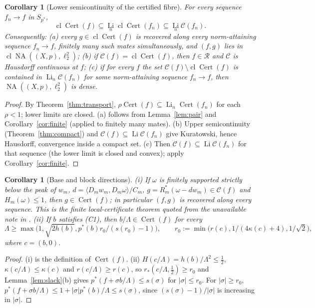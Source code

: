 \documentclass[10pt]{amsart}
\newtheorem{corollary}[theorem]{Corollary}
\theoremstyle{definition}
\theoremstyle{remark}
\newcommand{\NA}{\operatorname{NA}}
\newcommand{\Cset}{\mathcal C}
\newcommand{\Cert}{\operatorname{Cert}}
\newcommand{\Li}{\operatorname*{Li}}
\newcommand{\cl}{\operatorname{cl}}
\newcommand{\Rec}{\mathcal R}
\newcommand{\ip}[2]{\langle #1,#2\rangle}
\begin{document}
\begin{corollary}[Lower semicontinuity of the certified fibre]\label{cor:lsc}
For every sequence $f_n\to f$ in $S_{p^*}$,
\[
 \cl\Cert(f)\subseteq\Li_n\cl\Cert(f_n)\subseteq\Li_n\Cset(f_n).
\]
Consequently: \textup{(a)} every $g\in\cl\Cert(f)$ is recovered along every
norm-attaining sequence $f_n\to f$, finitely many such mates simultaneously,
and $(f,g)$ lies in $\cl\NA((X,p),\ell_2^2)$; \textup{(b)} if
$\Cset(f)=\cl\Cert(f)$, then $f\in\Rec$ and $\Cset$ is Hausdorff continuous
at $f$; \textup{(c)} if for every $f$ the set
$\Cset(f)\setminus\cl\Cert(f)$ is contained in $\Li_n\Cset(f_n)$ for \emph{some} norm-attaining sequence
$f_n\to f$, then $\NA((X,p),\ell_2^2)$ is dense.
\end{corollary}

\begin{proof}
By Theorem~\ref{thm:transport}, $\rho\Cert(f)\subseteq\Li_n\Cert(f_n)$ for
each $\rho<1$; lower limits are closed.  (a) follows from
Lemma~\ref{lem:pair} and Corollary~\ref{cor:finite} (applied to finitely
many mates).  (b) Upper semicontinuity (Theorem~\ref{thm:compact}) and
$\Cset(f)\subseteq\Li\Cset(f_n)$ give Kuratowski, hence Hausdorff,
convergence inside a compact set.  (c) Then $\Cset(f)\subseteq
\Li\Cset(f_n)$ for that sequence (the lower limit is closed and convex);
apply Corollary~\ref{cor:finite}.
\end{proof}

\begin{corollary}[Base and block directions]\label{cor:check}
\textup{(i)} If $\omega$ is finitely supported strictly below the peak of
$w_m$, $d=\ip{D_mw_m}{D_m\omega}/C_m$, $g=R_m^*(\omega-dw_m)\in\Cset(f)$
and $H_m(\omega)\le1$, then $g\in\Cert(f)$; in particular $(f,g)$ is
recovered along every sequence.  This is the finite local-certificate
theorem quoted from the unavailable note \cite{Check} in \cite{PrA}.
\textup{(ii)} If $b$ satisfies \textup{(C1)}, then $b/\Lambda\in\Cert(f)$
for every
\[
 \Lambda\ge\max\big(1,\sqrt{2h(b)},p^*(b)r_0/(s(r_0)-1)\big),
 \qquad r_0:=\min\big(r(c),1/(4\kappa(c)+4),1/\sqrt2\big),
\]
where $c=(b,0)$.
\end{corollary}

\begin{proof}
(i) is the definition of $\Cert(f)$.  (ii) $H(c/\Lambda)=h(b)/\Lambda^2\le
\frac12$, $\kappa(c/\Lambda)\le\kappa(c)$ and $r(c/\Lambda)\ge r(c)$, so
$r_*(c/\Lambda,\frac12)\ge r_0$ and Lemma~\ref{lem:slack}(b) gives
$p^*(f+\sigma b/\Lambda)\le s(\sigma)$ for $|\sigma|\le r_0$.  For
$|\sigma|\ge r_0$, $p^*(f+\sigma b/\Lambda)\le1+|\sigma|p^*(b)/\Lambda\le
s(\sigma)$, since $(s(\sigma)-1)/|\sigma|$ is increasing in $|\sigma|$.
\end{proof}
\end{document}
